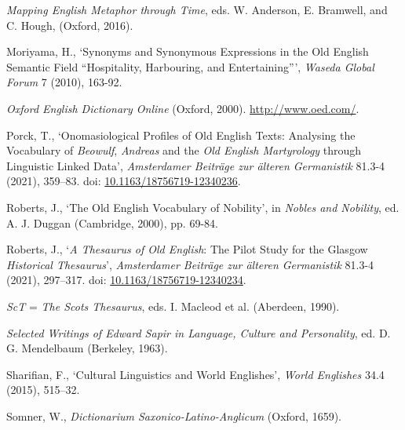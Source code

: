 \begin{list}{}
\item %
\textit{Mapping English Metaphor through Time}, eds. W. Anderson, E. Bramwell, and C. Hough, (Oxford, 2016).

\item %
Moriyama, H., `Synonyms and Synonymous Expressions in the Old English Semantic Field ``Hospitality, Harbouring, and Entertaining''', \textit{Waseda Global Forum} 7 (2010), 163-92.

\item %
\textit{Oxford English Dictionary Online} (Oxford, 2000). \url{http://www.oed.com/}.

\item %
Porck, T., `Onomasiological Profiles of Old English Texts: Analysing the Vocabulary of \textit{Beowulf}, \textit{Andreas} and the \textit{Old English Martyrology} through Linguistic Linked Data', \textit{Amsterdamer Beiträge zur älteren Germanistik} 81.3-4 (2021), 359–83. doi: \href{https://doi.org/10.1163/18756719-12340236}{\url{10.1163/18756719-12340236}}.

\item %
Roberts, J., `The Old English Vocabulary of Nobility', in \textit{Nobles and Nobility}, ed. A. J. Duggan (Cambridge, 2000), pp. 69-84.

\item %
Roberts, J., `\textit{A Thesaurus of Old English}: The Pilot Study for the Glasgow \textit{Historical Thesaurus}', \textit{Amsterdamer Beiträge zur älteren Germanistik} 81.3-4 (2021), 297–317. doi: \href{https://doi.org/10.1163/18756719-12340234}{\url{10.1163/18756719-12340234}}.

\item %
\textit{ScT} = \textit{The Scots Thesaurus}, eds. I. Macleod et al. (Aberdeen, 1990).

\item %
\textit{Selected Writings of Edward Sapir in Language, Culture and Personality}, ed. D. G. Mendelbaum (Berkeley, 1963).

\item %
Sharifian, F., ‘Cultural Linguistics and World Englishes’, \textit{World Englishes} 34.4 (2015), 515–32.

\item
Somner, W., \textit{Dictionarium Saxonico-Latino-Anglicum} (Oxford, 1659).


\end{list}
